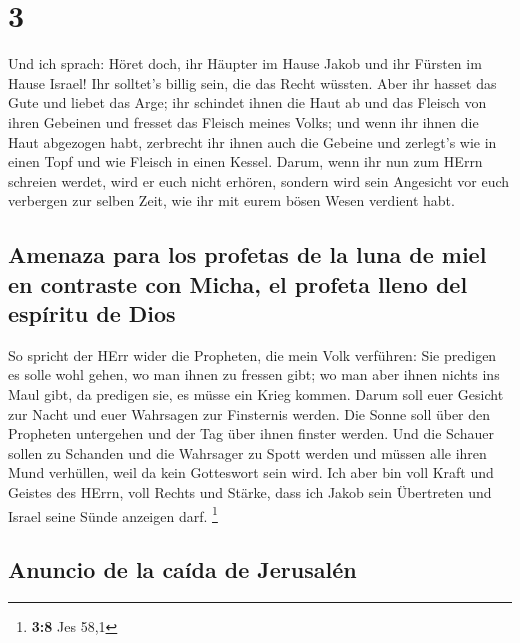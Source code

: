 \hypertarget{section-2}{%
\section{3}\label{section-2}}

 Und ich sprach: Höret doch, ihr Häupter im Hause Jakob
und ihr Fürsten im Hause Israel! Ihr solltet's billig sein, die das
Recht wüssten.  Aber ihr hasset das Gute und liebet das
Arge; ihr schindet ihnen die Haut ab und das Fleisch von ihren Gebeinen
 und fresset das Fleisch meines Volks; und wenn ihr ihnen
die Haut abgezogen habt, zerbrecht ihr ihnen auch die Gebeine und
zerlegt's wie in einen Topf und wie Fleisch in einen Kessel.
 Darum, wenn ihr nun zum HErrn schreien werdet, wird er
euch nicht erhören, sondern wird sein Angesicht vor euch verbergen zur
selben Zeit, wie ihr mit eurem bösen Wesen verdient habt.

\hypertarget{amenaza-para-los-profetas-de-la-luna-de-miel-en-contraste-con-micha-el-profeta-lleno-del-espuxedritu-de-dios}{%
\subsection{Amenaza para los profetas de la luna de miel en contraste
con Micha, el profeta lleno del espíritu de
Dios}\label{amenaza-para-los-profetas-de-la-luna-de-miel-en-contraste-con-micha-el-profeta-lleno-del-espuxedritu-de-dios}}

 So spricht der HErr wider die Propheten, die mein Volk
verführen: Sie predigen es solle wohl gehen, wo man ihnen zu fressen
gibt; wo man aber ihnen nichts ins Maul gibt, da predigen sie, es müsse
ein Krieg kommen.  Darum soll euer Gesicht zur Nacht und
euer Wahrsagen zur Finsternis werden. Die Sonne soll über den Propheten
untergehen und der Tag über ihnen finster werden.  Und die
Schauer sollen zu Schanden und die Wahrsager zu Spott werden und müssen
alle ihren Mund verhüllen, weil da kein Gotteswort sein wird.
 Ich aber bin voll Kraft und Geistes des HErrn, voll
Rechts und Stärke, dass ich Jakob sein Übertreten und Israel seine Sünde
anzeigen darf. \footnote{\textbf{3:8} Jes 58,1}

\hypertarget{anuncio-de-la-cauxedda-de-jerusaluxe9n}{%
\subsection{Anuncio de la caída de
Jerusalén}\label{anuncio-de-la-cauxedda-de-jerusaluxe9n}}


